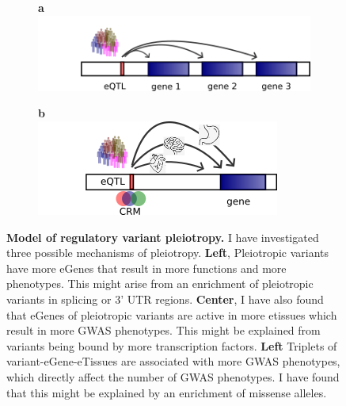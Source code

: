%
\begin{figure}[h!]
    \centering
%
    \begin{subfigure}[]{0.95\textwidth}
        \textbf{a}
        \\
        \includegraphics[width=\textwidth]{fig/model1.png}
    \end{subfigure}
%
    \begin{subfigure}[]{0.95\textwidth}
        \textbf{b}
        \\
        \includegraphics[width=\textwidth]{fig/model2.png}
    \end{subfigure}

    \caption{\textbf{Model of regulatory variant pleiotropy.} I have investigated three possible mechanisms of pleiotropy. \textbf{Left}, Pleiotropic variants have more eGenes that result in more functions and more phenotypes. This might arise from an enrichment of pleiotropic variants in splicing or 3' UTR regions. \textbf{Center}, I have also found that eGenes of pleiotropic variants are active in more etissues which result in more GWAS phenotypes. This might be explained from variants being bound by more transcription factors. \textbf{Left} Triplets of variant-eGene-eTissues are associated with more GWAS phenotypes, which directly affect the number of GWAS phenotypes. I have found that this might be explained by an enrichment of missense alleles.} \label{fig:beta}
%
\end{figure}

